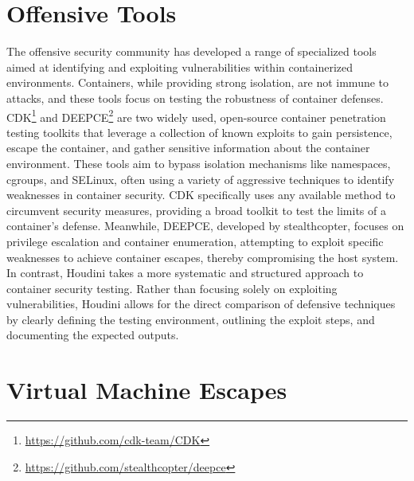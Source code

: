 \documentclass[12pt]{report}
\begin{document}
\begin{doublespace}
\section{Offensive Tools} 

The offensive security community has developed a range of specialized tools aimed at identifying and exploiting vulnerabilities within containerized environments. Containers, while providing strong isolation, are not immune to attacks, and these tools focus on testing the robustness of container defenses. CDK\footnote{\url{https://github.com/cdk-team/CDK}} and DEEPCE\footnote{\url{https://github.com/stealthcopter/deepce}} are two widely used, open-source container penetration testing toolkits that leverage a collection of known exploits to gain persistence, escape the container, and gather sensitive information about the container environment. These tools aim to bypass isolation mechanisms like namespaces, cgroups, and SELinux, often using a variety of aggressive techniques to identify weaknesses in container security. CDK specifically uses any available method to circumvent security measures, providing a broad toolkit to test the limits of a container's defense. Meanwhile, DEEPCE, developed by stealthcopter, focuses on privilege escalation and container enumeration, attempting to exploit specific weaknesses to achieve container escapes, thereby compromising the host system. In contrast, Houdini takes a more systematic and structured approach to container security testing. Rather than focusing solely on exploiting vulnerabilities, Houdini allows for the direct comparison of defensive techniques by clearly defining the testing environment, outlining the exploit steps, and documenting the expected outputs.\\

\section{Virtual Machine Escapes} 


\end{doublespace}
\end{document}
